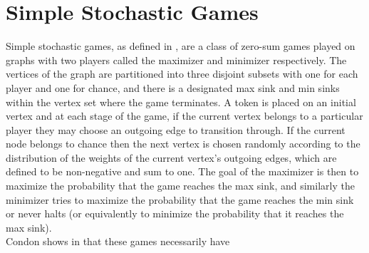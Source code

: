 \section{Simple Stochastic Games}
Simple stochastic games, as defined in \citep{condon}, are a class of
zero-sum games played on graphs with two players called the maximizer and minimizer
respectively. The vertices of the graph are partitioned into three disjoint
subsets with one for each player and one for chance, and there is a designated
max sink and min sinks within the vertex set where the game terminates.
A token is placed on an initial vertex and at each stage of the game,
if the current vertex belongs to a particular player they may choose an outgoing edge to transition through.
If the current node belongs to chance then the next vertex is chosen randomly according to the distribution
of the weights of the current vertex's outgoing edges, which are defined to be non-negative and sum to one.
The goal of the maximizer is then to maximize the probability that the game reaches the max sink, and similarly
the minimizer tries to maximize the probability that the game reaches the min sink or never halts (or equivalently to minimize the
probability that it reaches the max sink). \\
Condon shows in \citep{condon} that these games necessarily have 
